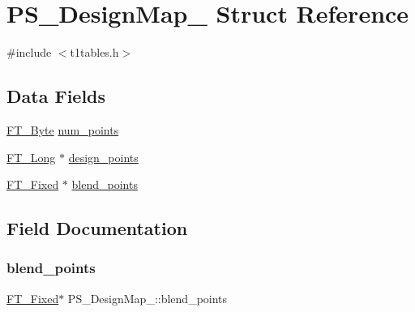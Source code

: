\hypertarget{struct_p_s___design_map__}{}\section{P\+S\+\_\+\+Design\+Map\+\_\+ Struct Reference}
\label{struct_p_s___design_map__}


{\ttfamily \#include $<$t1tables.\+h$>$}

\subsection*{Data Fields}
\begin{DoxyCompactItemize}
\item 
\hyperlink{fttypes_8h_a51f26183ca0c9f4af958939648caeccd}{F\+T\+\_\+\+Byte} \hyperlink{struct_p_s___design_map___a505a70dd0f497f177fffca9bc4e5d0a5}{num\+\_\+points}
\item 
\hyperlink{fttypes_8h_a7fa72a1f0e79fb1860c5965789024d6f}{F\+T\+\_\+\+Long} $\ast$ \hyperlink{struct_p_s___design_map___abd7a86ba33248ceed657c31063b49679}{design\+\_\+points}
\item 
\hyperlink{fttypes_8h_a5f5a679cc09f758efdd0d1c5feed3c3d}{F\+T\+\_\+\+Fixed} $\ast$ \hyperlink{struct_p_s___design_map___a74a555fb4315fca7477f6d20d49686ec}{blend\+\_\+points}
\end{DoxyCompactItemize}


\subsection{Field Documentation}
\mbox{\label{struct_p_s___design_map___a74a555fb4315fca7477f6d20d49686ec}} 
\subsubsection{\texorpdfstring{blend\+\_\+points}{blend\_points}}
{\footnotesize\ttfamily \hyperlink{fttypes_8h_a5f5a679cc09f758efdd0d1c5feed3c3d}{F\+T\+\_\+\+Fixed}$\ast$ P\+S\+\_\+\+Design\+Map\+\_\+\+::blend\+\_\+points}

\mbox{\label{struct_p_s___design_map___abd7a86ba33248ceed657c31063b49679}} 
